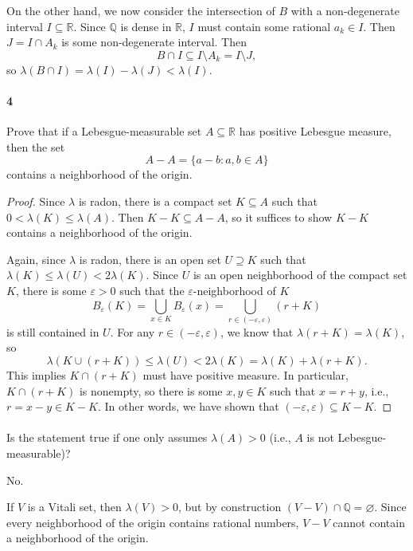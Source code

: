 \documentclass[12pt]{article}
\newlength{\myparskip}
\newenvironment{fullbox}{\begin{lrbox}{\savefullbox}\begin{minipage}{\dimexpr\textwidth-2\fboxsep\relax}\setlength{\parskip}{\myparskip}}{\end{minipage}\end{lrbox}\framebox[\textwidth]{\usebox{\savefullbox}}}
\newenvironment{pbox}[1][]{\begin{fullbox}\ifx#1\empty\else\paragraph{#1}\fi}{\end{fullbox}}
\newcommand{\Q}{\mathbb{Q}}
\newcommand{\R}{\mathbb{R}}
\newcommand{\eps}{\varepsilon}
\renewcommand{\emptyset}{\varnothing}
\newcommand{\<}{\langle}
\renewcommand{\>}{\rangle}
\begin{document}
On the other hand, we now consider the intersection of $B$ with a non-degenerate interval $I \subseteq \R$. Since $\Q$ is dense in $\R$, $I$ must contain some rational $a_k \in I$. Then $J = I \cap A_k$ is some non-degenerate interval. Then
\[
    B \cap I \subseteq I \setminus A_k = I \setminus J,
\]
so $\lambda(B \cap I) = \lambda(I) - \lambda(J) < \lambda(I)$.



\newpage
\begin{pbox}[4]
    Prove that if a Lebesgue-measurable set $A \subseteq \R$ has positive Lebesgue measure, then the set
    \[
        A - A = \{a - b : a, b \in A\}
    \]
    contains a neighborhood of the origin.
\end{pbox}

\begin{proof}
    Since $\lambda$ is radon, there is a compact set $K \subseteq A$ such that $0 < \lambda(K) \leq \lambda(A)$. Then $K - K \subseteq A - A$, so it suffices to show $K - K$ contains a neighborhood of the origin. 

    Again, since $\lambda$ is radon, there is an open set $U \supseteq K$ such that $\lambda(K) \leq \lambda(U) < 2\lambda(K)$. Since $U$ is an open neighborhood of the compact set $K$, there is some $\eps > 0$ such that the $\eps$-neighborhood of $K$
    \[
        B_\eps(K) = \bigcup_{x \in K} B_\eps(x) = \bigcup_{r \in (-\eps, \eps)} (r + K)
    \]
    is still contained in $U$. For any $r \in (-\eps, \eps)$, we know that $\lambda(r + K) = \lambda(K)$, so
    \[
        \lambda(K \cup (r + K)) \leq \lambda(U) < 2\lambda(K) = \lambda(K) + \lambda(r + K).
    \]
    This implies $K \cap (r + K)$ must have positive measure. In particular, $K \cap (r + K)$ is nonempty, so there is some $x, y \in K$ such that $x = r + y$, i.e., $r = x - y \in K - K$. In other words, we have shown that $(-\eps, \eps) \subseteq K - K$.
\end{proof}

\begin{pbox}
    Is the statement true if one only assumes $\lambda(A) > 0$ (i.e., $A$ is not Lebesgue-measurable)?
\end{pbox}

No.

If $V$ is a Vitali set, then $\lambda(V) > 0$, but by construction $(V - V) \cap \Q = \emptyset$. Since every neighborhood of the origin contains rational numbers, $V - V$ cannot contain a neighborhood of the origin.
\end{document}
